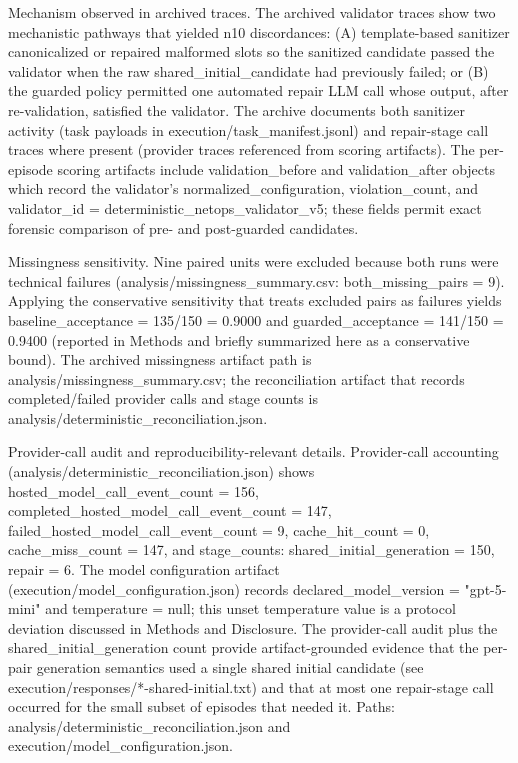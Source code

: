 \documentclass[conference]{IEEEtran}
\begin{document}
Mechanism observed in archived traces. The archived validator traces show two mechanistic pathways that yielded n10 discordances: (A) template-based sanitizer canonicalized or repaired malformed slots so the sanitized candidate passed the validator when the raw shared\_initial\_candidate had previously failed; or (B) the guarded policy permitted one automated repair LLM call whose output, after re-validation, satisfied the validator. The archive documents both sanitizer activity (task payloads in execution/task\_manifest.jsonl) and repair-stage call traces where present (provider traces referenced from scoring artifacts). The per-episode scoring artifacts include validation\_before and validation\_after objects which record the validator's normalized\_configuration, violation\_count, and validator\_id = deterministic\_netops\_validator\_v5; these fields permit exact forensic comparison of pre- and post-guarded candidates.

Missingness sensitivity. Nine paired units were excluded because both runs were technical failures (analysis/missingness\_summary.csv: both\_missing\_pairs = 9). Applying the conservative sensitivity that treats excluded pairs as failures yields baseline\_acceptance = 135/150 = 0.9000 and guarded\_acceptance = 141/150 = 0.9400 (reported in Methods and briefly summarized here as a conservative bound). The archived missingness artifact path is analysis/missingness\_summary.csv; the reconciliation artifact that records completed/failed provider calls and stage counts is analysis/deterministic\_reconciliation.json.

Provider-call audit and reproducibility-relevant details. Provider-call accounting (analysis/deterministic\_reconciliation.json) shows hosted\_model\_call\_event\_count = 156, completed\_hosted\_model\_call\_event\_count = 147, failed\_hosted\_model\_call\_event\_count = 9, cache\_hit\_count = 0, cache\_miss\_count = 147, and stage\_counts: shared\_initial\_generation = 150, repair = 6. The model configuration artifact (execution/model\_configuration.json) records declared\_model\_version = "gpt-5-mini" and temperature = null; this unset temperature value is a protocol deviation discussed in Methods and Disclosure. The provider-call audit plus the shared\_initial\_generation count provide artifact-grounded evidence that the per-pair generation semantics used a single shared initial candidate (see execution/responses/*-shared-initial.txt) and that at most one repair-stage call occurred for the small subset of episodes that needed it. Paths: analysis/deterministic\_reconciliation.json and execution/model\_configuration.json.
\end{document}
